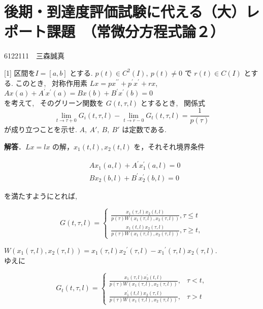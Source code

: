 \documentclass{jsarticle}
\begin{document}
\section*{後期・到達度評価試験に代える（大）レポート課題　（常微分方程式論２）}

\begin{flushright}
6122111　三森誠真
\end{flushright}

\begin{itembox}[l]{[1]}
区間を$I = [a,b]$ とする. $p(t) \in C^2(I), \ p(t) \neq 0$ で $r(t) \in C(I)$ とする. このとき, \ 対称作用素
$L x=p x^{\prime \prime}+p^{\prime} x^{\prime}+r x$,\\
$A x(a)+A^{\prime} x^{\prime}(a)=B x(b)+B^{\prime} x^{\prime}(b)=0$\\
を考えて, \ そのグリーン関数を $G(t, \tau, l)$ とするとき, \ 関係式
$$
\lim _{t \rightarrow \tau+0} G_{i}(t, \tau, l)-\lim _{t \rightarrow r-0} G_{t}(t, \tau, l)=\frac{1}{p(\tau)}
$$
が成り立つことを示せ. $A, \ A', \ B, \ B'$ は定数である.
\end{itembox}

\textbf{解答}．$L x=l x$ の解，$x_{1}(t, l), x_{2}(t, l)$ を，それそれ境界条件

$$
\begin{aligned}
& A x_{1}(a, l)+A^{\prime} x_{1}^{\prime}(a, l)=0 \\
& B x_{2}(b, l)+B^{\prime} x_{2}^{\prime}(b, l)=0
\end{aligned}
$$

を満たすようにとれば, 

$$
G(t, \tau, l)=\left\{\begin{array}{l}
\frac{x_{1}(\tau, l) x_{2}(t, l)}{p(\tau) W\left(x_{1}(\tau, l), x_{2}(\tau, l)\right)}, \tau \leq t \\
\frac{x_{1}(t, l) x_{2}(\tau, l)}{p(\tau) W\left(x_{1}(\tau, l), x_{2}(\tau, l)\right)}, \tau \geq t,
\end{array}\right.
$$

$W\left(x_{1}(\tau, l), x_{2}(\tau, l)\right)=x_{1}(\tau, l) x_{2}{ }^{\prime}(\tau, l)-x_{1}{ }^{\prime}(\tau, l) x_{2}(\tau, l)$.\\
ゆえに

$$
G_{t}(t, \tau, l)= \begin{cases}\frac{x_{1}(\tau, l) x_{2}^{\prime}(t, l)}{p(\tau) W\left(x_{1}(\tau, l), x_{2}(\tau, l)\right)}, & \tau<t, \\ \frac{x_{1}^{\prime}(t, l) x_{2}(\tau, l)}{p(\tau) W\left(x_{1}(\tau, l), x_{2}(\tau, l)\right)}, & \tau>t\end{cases}
$$
\end{document}
